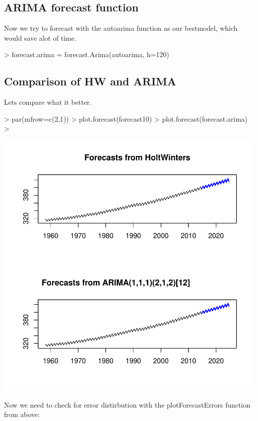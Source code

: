 \documentclass[11pt, a4paper]{article} %
\begin{document}
\subsection{ARIMA forecast function}
Now we try to forecast with the autoarima function as our bestmodel, which would save alot of time. 

\begin{Schunk}
\begin{Sinput}
> forecast.arima = forecast.Arima(autoarima, h=120) 
\end{Sinput}
\end{Schunk}

\subsection{Comparison of HW and ARIMA}
Lets compare what it better. 

\begin{Schunk}
\begin{Sinput}
> par(mfrow=c(2,1))
> plot.forecast(forecast10)
> plot.forecast(forecast.arima)
> 
\end{Sinput}
\end{Schunk}
\includegraphics{alleselena-070}

Now we need to check for error distirbution with the plotForecastErrors function from above:
\end{document}
